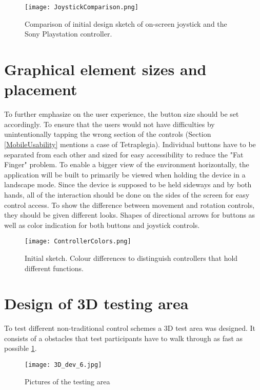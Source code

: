 \begin{figure}[H]
\centering
\texttt{[image: JoystickComparison.png]}
\caption{Comparison of initial design sketch of on-screen joystick and the Sony Playstation controller.}
\end{figure}

\section{Graphical element sizes and placement}
To further emphasize on the user experience, the button size should be set accordingly. To ensure that the users would not have difficulties by unintentionally tapping the wrong section of the controls (Section \ref{MobileUsability} mentions a case of Tetraplegia). Individual buttons have to be separated from each other and sized for easy accessibility to reduce the "Fat Finger" problem. To enable a bigger view of the environment horizontally, the application will be built to primarily be viewed when holding the device in a landscape mode. Since the device is supposed to be held sideways and by both hands, all of the interaction should be done on the sides of the screen for easy control access.
To show the difference between movement and rotation controls, they should be given different looks. Shapes of directional arrows for buttons as well as color indication for both buttons and joystick controls.

\begin{figure}[H]
\centering
\texttt{[image: ControllerColors.png]}
\caption{Initial sketch. Colour differences to distinguish controllers that hold different functions.}
\end{figure}

\section{Design of 3D testing area}\label{DesignTestArea}
To test different non-traditional control schemes a 3D test area was designed. It consists of a obstacles that test participants have to walk through as fast as possible \ref{TestLevels}.

\begin{figure}[H]
\centering
\texttt{[image: 3D\_dev\_6.jpg]}
\caption{Pictures of the testing area}
\label{TestLevels}
\end{figure}

